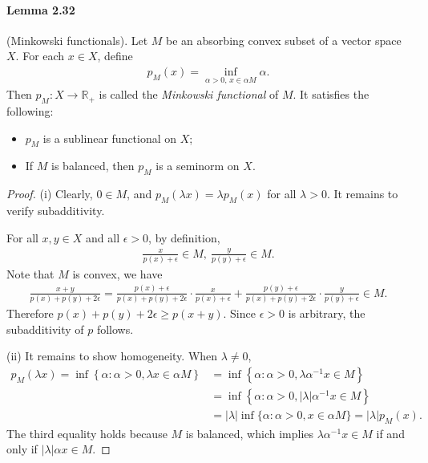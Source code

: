 \documentclass{article}
\begin{document}
\paragraph{Lemma 2.32\label{lemma:2.32}} (Minkowski functionals). Let $M$ be an absorbing convex subset of a vector space $X$. For each $x\in X$, define
\begin{align*}
	p_M(x) = \inf_{\alpha>0,\,x\in\alpha M}\alpha.
\end{align*}
Then $p_M:X\to\mathbb{R}_+$ is called the \textit{Minkowski functional} of $M$. It satisfies the following:
\vspace{0.05cm}
\begin{itemize}
	\item[(i)] $p_M$ is a sublinear functional on $X$;
	\vspace{0.05cm}
	\item[(ii)] If $M$ is balanced, then $p_M$ is a seminorm on $X$.
\end{itemize}
\begin{proof}
(i) Clearly, $0\in M$, and $p_M(\lambda x)=\lambda p_M(x)$ for all $\lambda > 0$. It remains to verify subadditivity.

For all $x,y\in X$ and all $\epsilon>0$, by definition,
\begin{align*}
	\frac{x}{p(x)+\epsilon}\in M,\ \frac{y}{p(y)+\epsilon}\in M.
\end{align*}
Note that $M$ is convex, we have
\begin{align*}
	\frac{x+y}{p(x)+p(y)+2\epsilon} = \frac{p(x)+\epsilon}{p(x)+p(y)+2\epsilon}\cdot\frac{x}{p(x)+\epsilon} +  \frac{p(y)+\epsilon}{p(x)+p(y)+2\epsilon}\cdot\frac{y}{p(y)+\epsilon} \in M.
\end{align*}
Therefore $p(x)+p(y)+2\epsilon \geq p(x+y)$. Since $\epsilon>0$ is arbitrary, the subadditivity of $p$ follows.
\vspace{0.1cm}

(ii) It remains to show homogeneity. When $\lambda\neq 0$,
\begin{align*}
	p_M(\lambda x) = \inf\left\{\alpha:\alpha>0,\lambda x\in \alpha M\right\} &= \inf\left\{\alpha:\alpha>0,\lambda\alpha^{-1}x\in M\right\}\\ &=\inf\left\{\alpha:\alpha>0,\vert\lambda\vert\alpha^{-1}x\in M\right\}\\
	&= \vert\lambda\vert\inf\{\alpha:\alpha>0,x\in\alpha M\} = \vert\lambda\vert p_M(x).
\end{align*}
The third equality holds because $M$ is balanced, which implies $\lambda\alpha^{-1}x\in M$ if and only if $\vert\lambda\vert\alpha x\in M$. 
\end{proof}
\end{document}
